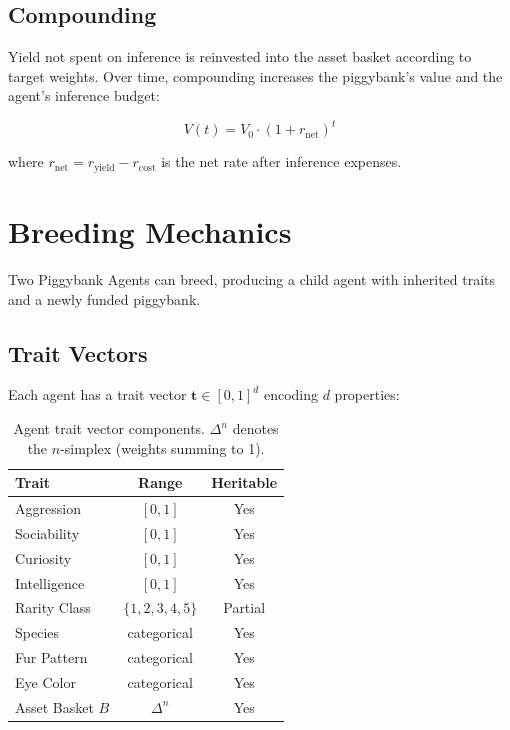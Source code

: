 \documentclass[11pt,letterpaper]{article}
\begin{document}
\subsection{Compounding}

Yield not spent on inference is reinvested into the asset basket according to target weights. Over time, compounding increases the piggybank's value and the agent's inference budget:

\begin{equation}
V(t) = V_0 \cdot \left(1 + r_{\text{net}}\right)^t
\end{equation}

where $r_{\text{net}} = r_{\text{yield}} - r_{\text{cost}}$ is the net rate after inference expenses.

\section{Breeding Mechanics}
\label{sec:breeding}

Two Piggybank Agents can breed, producing a child agent with inherited traits and a newly funded piggybank.

\subsection{Trait Vectors}

Each agent has a trait vector $\mathbf{t} \in [0,1]^d$ encoding $d$ properties:

\begin{table}[t]
\centering
\begin{tabular}{lcc}
\toprule
\textbf{Trait} & \textbf{Range} & \textbf{Heritable} \\
\midrule
Aggression & $[0, 1]$ & Yes \\
Sociability & $[0, 1]$ & Yes \\
Curiosity & $[0, 1]$ & Yes \\
Intelligence & $[0, 1]$ & Yes \\
Rarity Class & $\{1,2,3,4,5\}$ & Partial \\
Species & categorical & Yes \\
Fur Pattern & categorical & Yes \\
Eye Color & categorical & Yes \\
\midrule
Asset Basket $B$ & $\Delta^n$ & Yes \\
\bottomrule
\end{tabular}
\caption{Agent trait vector components. $\Delta^n$ denotes the $n$-simplex (weights summing to 1).}
\label{tab:traits}
\end{table}
\end{document}
